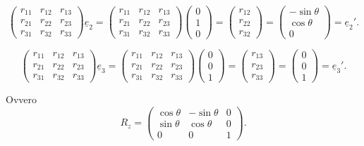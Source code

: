 \[
\begin{pmatrix}
r_{11} & r_{12} & r_{13}\\
r_{21} & r_{22} & r_{23}\\
r_{31} & r_{32} & r_{33}
\end{pmatrix}
\underline{e}_2
=
\begin{pmatrix}
r_{11} & r_{12} & r_{13}\\
r_{21} & r_{22} & r_{23}\\
r_{31} & r_{32} & r_{33}
\end{pmatrix}
\begin{pmatrix}
0\\
1\\
0
\end{pmatrix}
=
\begin{pmatrix}
r_{12}\\
r_{22}\\
r_{32}
\end{pmatrix}
=
\begin{pmatrix}
-\sin\theta\\
\cos\theta\\
0
\end{pmatrix}
=
\underline{e}_2'.
\]

\[
\begin{pmatrix}
r_{11} & r_{12} & r_{13}\\
r_{21} & r_{22} & r_{23}\\
r_{31} & r_{32} & r_{33}
\end{pmatrix}
\underline{e}_3
=
\begin{pmatrix}
r_{11} & r_{12} & r_{13}\\
r_{21} & r_{22} & r_{23}\\
r_{31} & r_{32} & r_{33}
\end{pmatrix}
\begin{pmatrix}
0\\
0\\
1
\end{pmatrix}
=
\begin{pmatrix}
r_{13}\\
r_{23}\\
r_{33}
\end{pmatrix}
=
\begin{pmatrix}
0\\
0\\
1
\end{pmatrix}
=
\underline{e}_3'.
\]

Ovvero
\[
R_z
=
\begin{pmatrix}
\cos\theta & -\sin\theta & 0\\
\sin\theta & \cos\theta & 0\\
0 & 0 & 1
\end{pmatrix}.
\]

